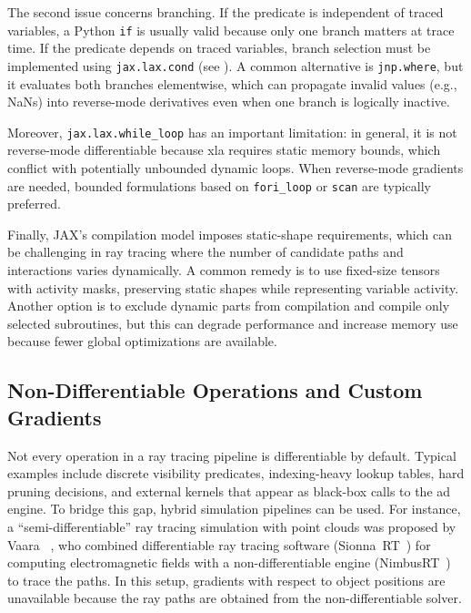 The second issue concerns branching. If the predicate is independent of traced variables, a Python \texttt{if} is usually valid because only one branch matters at trace time. If the predicate depends on traced variables, branch selection must be implemented using \texttt{jax.lax.cond} (see ). A common alternative is \texttt{jnp.where}, but it evaluates both branches elementwise, which can propagate invalid values (e.g., NaNs) into reverse-mode derivatives even when one branch is logically inactive.

Moreover, \texttt{jax.lax.while\_loop} has an important limitation: in general, it is not reverse-mode differentiable because \gls{xla} requires static memory bounds, which conflict with potentially unbounded dynamic loops. When reverse-mode gradients are needed, bounded formulations based on \texttt{fori\_loop} or \texttt{scan} are typically preferred.

Finally, JAX's compilation model imposes static-shape requirements, which can be challenging in ray tracing where the number of candidate paths and interactions varies dynamically. A common remedy is to use fixed-size tensors with activity masks, preserving static shapes while representing variable activity. Another option is to exclude dynamic parts from compilation and compile only selected subroutines, but this can degrade performance and increase memory use because fewer global optimizations are available.

\subsection{Non-Differentiable Operations and Custom Gradients}

Not every operation in a ray tracing pipeline is differentiable by default. Typical examples include discrete visibility predicates, indexing-heavy lookup tables, hard pruning decisions, and external kernels that appear as black-box calls to the \gls{ad} engine. To bridge this gap, hybrid simulation pipelines can be used. For instance, a \enquote{semi-differentiable} ray tracing simulation with point clouds was proposed by Vaara \etal~, who combined differentiable ray tracing software (Sionna~RT~) for computing electromagnetic fields with a non-differentiable engine (NimbusRT~) to trace the paths. In this setup, gradients with respect to object positions are unavailable because the ray paths are obtained from the non-differentiable solver.

